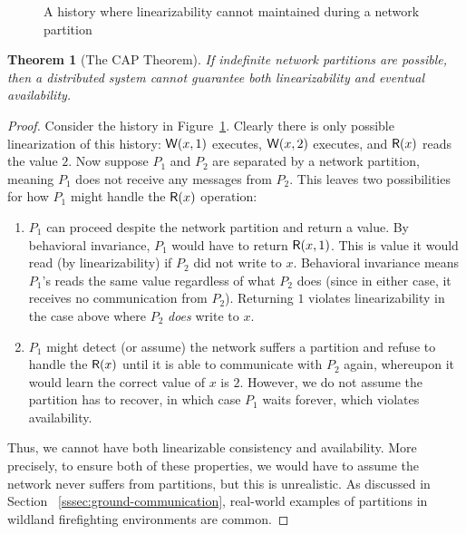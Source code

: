 \documentclass[]             %
{NASA}                       %
\newtheorem{theorem}{Theorem}[section]
\theoremstyle{definition}
\begin{document}
\begin{figure}
  
  \caption{A history where linearizability cannot maintained during a network partition}
  \label{fig:dsm-cap-example-1}
\end{figure}

\begin{theorem}[The CAP Theorem]
  \label{thm:cap}
  If indefinite network partitions are possible, then a distributed
  system cannot guarantee both linearizability and
  eventual availability.
\end{theorem}
\begin{proof}
  Consider the history in Figure~\ref{fig:dsm-cap-example-1}. Clearly
  there is only possible linearization of this history:
  $\mathsf{W}\!\left(x, 1\right)$ executes, $\mathsf{W}\!\left(x, 2\right)$ executes, and
  $\mathsf{R}\!\left(x\right)$ reads the value $2$. Now suppose $P_1$ and $P_2$ are
  separated by a network partition, meaning $P_1$ does not receive any
  messages from $P_2$. This leaves two possibilities for how $P_1$
  might handle the $\mathsf{R}\!\left(x\right)$ operation:
  \begin{enumerate}
  \item $P_1$ can proceed despite the network partition and return a
    value. By behavioral invariance, $P_1$ would have to return
    $\mathsf{R}\!\left(x, 1\right)$. This is value it would read (by
    linearizability) if $P_2$ did not write to $x$. Behavioral
    invariance means $P_1$'s reads the same value regardless of what
    $P_2$ does (since in either case, it receives no communication
    from $P_2$). Returning $1$ violates linearizability in the case
    above where $P_2$ \emph{does} write to $x$.
  \item $P_1$ might detect (or assume) the network suffers a partition
    and refuse to handle the $\mathsf{R}\!\left(x\right)$ until it is able to
    communicate with $P_2$ again, whereupon it would learn the correct
    value of $x$ is $2$. However, we do not assume the partition has
    to recover, in which case $P_1$ waits forever, which violates
    availability.
  \end{enumerate}
  Thus, we cannot have both linearizable consistency and
  availability. More precisely, to ensure both of these properties, we
  would have to assume the network never suffers from partitions, but
  this is unrealistic. As discussed in Section
 ~\ref{sssec:ground-communication}, real-world examples of partitions
  in wildland firefighting environments are common.
\end{proof}
\end{document}
